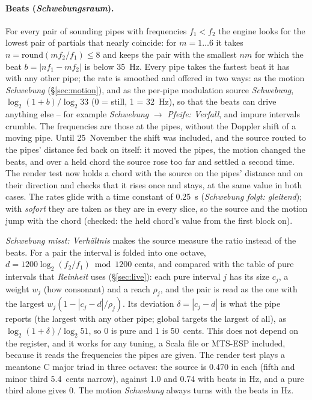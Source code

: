 \documentclass[11pt,a4paper,parskip=half,DIV=11,toc=bibliography]{scrartcl}
\newcommand{\ui}[1]{\emph{#1}}                 %
\begin{document}
\paragraph{Beats (\ui{Schwebungsraum}).}\label{sec:beats}
For every pair of sounding pipes with frequencies $f_1<f_2$ the engine looks for the lowest pair of partials that
nearly coincide: for $m=1\dots6$ it takes $n=\mathrm{round}(mf_2/f_1)\le8$ and keeps the pair with the smallest
$nm$ for which the beat $b=|nf_1-mf_2|$ is below \SI{35}{Hz}. Every pipe takes the fastest beat it has with any other
pipe; the rate is smoothed and offered in two ways: as the motion \ui{Schwebung} (\S\ref{sec:motion}), and as the
per-pipe modulation source \ui{Schwebung}, $\log_2(1+b)/\log_2 33$ (0 = still, 1 = \SI{32}{Hz}), so that the beats can
drive anything else -- for example \ui{Schwebung} $\rightarrow$ \ui{Pfeife: Verfall}, and impure intervals crumble.
The frequencies are those at the pipes, without the Doppler shift of a moving pipe. Until 25~November the shift was included, and the
source routed to the pipes' distance fed back on itself: it moved the pipes, the motion changed the beats, and over a held chord the
source rose too far and settled a second time. The render test now holds a chord with the source on the pipes' distance and on their
direction and checks that it rises once and stays, at the same value in both cases. The rates glide with a time constant of
\SI{0.25}{s} (\ui{Schwebung folgt: gleitend}); with \ui{sofort} they are taken as they are in every slice, so the source and the
motion jump with the chord (checked: the held chord's value from the first block on).

\ui{Schwebung misst: Verhältnis} makes the source measure the ratio instead of the beats. For a pair the interval is folded into one octave,
$d = 1200\log_2(f_2/f_1) \bmod 1200$ cents, and compared with the table of pure intervals that \ui{Reinheit} uses (\S\ref{sec:live}):
each pure interval $j$ has its size $c_j$, a weight $w_j$ (how consonant) and a reach $\rho_j$, and the pair is read as the one with the
largest $w_j(1-|c_j-d|/\rho_j)$. Its deviation $\delta = |c_j - d|$ is what the pipe reports (the largest with any other pipe; global
targets the largest of all), as $\log_2(1+\delta)/\log_2 51$, so 0 is pure and 1 is \SI{50}{cents}. This does not depend on the register,
and it works for any tuning, a Scala file or MTS-ESP included, because it reads the frequencies the pipes are given. The render test
plays a meantone C major triad in three octaves: the source is 0.470 in each (fifth and minor third \SI{5.4}{cents} narrow), against
1.0 and 0.74 with beats in Hz, and a pure third alone gives 0. The motion \ui{Schwebung} always turns with the beats in Hz.
\end{document}
